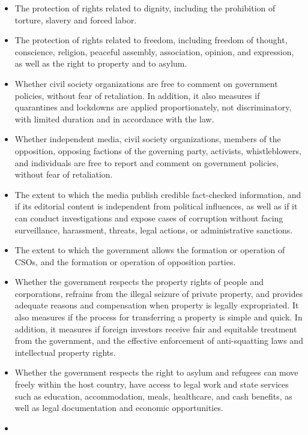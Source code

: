\documentclass[
]{agujournal2019}
\providecommand{\tightlist}{%
  \setlength{\itemsep}{0pt}\setlength{\parskip}{0pt}}\usepackage{longtable,booktabs,array}
\begin{document}
\begin{itemize}
\tightlist
\item
  The protection of rights related to dignity, including the prohibition
  of torture, slavery and forced labor.\\
\item
  The protection of rights related to freedom, including freedom of
  thought, conscience, religion, peaceful assembly, association,
  opinion, and expression, as well as the right to property and to
  asylum.
\item
  Whether civil society organizations are free to comment on government
  policies, without fear of retaliation. In addition, it also measures
  if quarantines and lockdowns are applied proportionately, not
  discriminatory, with limited duration and in accordance with the law.
\item
  Whether independent media, civil society organizations, members of the
  opposition, opposing factions of the governing party, activists,
  whistleblowers, and individuals are free to report and comment on
  government policies, without fear of retaliation.
\item
  The extent to which the media publish credible fact-checked
  information, and if its editorial content is independent from
  political influences, as well as if it can conduct investigations and
  expose cases of corruption without facing surveillance, harassment,
  threats, legal actions, or administrative sanctions.
\item
  The extent to which the government allows the formation or operation
  of CSOs, and the formation or operation of opposition parties.
\item
  Whether the government respects the property rights of people and
  corporations, refrains from the illegal seizure of private property,
  and provides adequate reasons and compensation when property is
  legally expropriated. It also measures if the process for transferring
  a property is simple and quick. In addition, it measures if foreign
  investors receive fair and equitable treatment from the government,
  and the effective enforcement of anti-squatting laws and intellectual
  property rights.
\item
  Whether the government respects the right to asylum and refugees can
  move freely within the host country, have access to legal work and
  state services such as education, accommodation, meals, healthcare,
  and cash benefits, as well as legal documentation and economic
  opportunities.
\item

\end{itemize}
\end{document}
